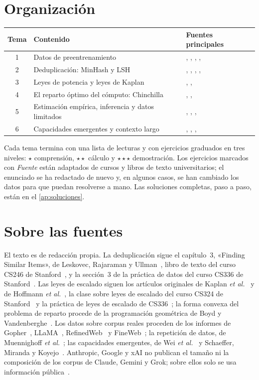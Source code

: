 \documentclass[11pt,a4paper,twoside,openany]{book}
\begin{document}
\section*{Organización}
\begin{center}
\small
\begin{tabular}{@{}cll@{}}
\toprule
Tema & Contenido & Fuentes principales \\
\midrule
1 & Datos de preentrenamiento & \cite{rae}, \cite{wenzek}, \cite{fineweb}, \cite{llama}, \cite{cs336a4} \\
2 & Deduplicación: MinHash y LSH & \cite{mmds}, \cite{cs246}, \cite{broder}, \cite{lee}, \cite{cs336a4} \\
3 & Leyes de potencia y leyes de Kaplan & \cite{kaplan}, \cite{cs324}, \cite{cs336a3} \\
4 & El reparto óptimo del cómputo: Chinchilla & \cite{hoffmann}, \cite{bv}, \cite{cs336a3} \\
5 & Estimación empírica, inferencia y datos limitados & \cite{hoffmann}, \cite{muennighoff}, \cite{sardana}, \cite{cs336a3} \\
6 & Capacidades emergentes y contexto largo & \cite{wei}, \cite{schaeffer}, \cite{chenpi}, \cite{llama3} \\
\bottomrule
\end{tabular}
\end{center}

Cada tema termina con una lista de lecturas y con ejercicios graduados en tres niveles: $\star$ comprensión, $\star\star$ cálculo y $\star\star\star$ demostración. Los ejercicios marcados con \emph{Fuente} están adaptados de cursos y libros de texto universitarios; el enunciado se ha redactado de nuevo y, en algunos casos, se han cambiado los datos para que puedan resolverse a mano. Las soluciones completas, paso a paso, están en el \cref{ap:soluciones}.

\section*{Sobre las fuentes}
El texto es de redacción propia. La deduplicación sigue el capítulo~3, «Finding Similar Items», de Leskovec, Rajaraman y Ullman~\cite{mmds}, libro de texto del curso CS246 de Stanford~\cite{cs246}, y la sección~3 de la práctica de datos del curso CS336 de Stanford~\cite{cs336a4}. Las leyes de escalado siguen los artículos originales de Kaplan \emph{et al.}~\cite{kaplan} y de Hoffmann \emph{et al.}~\cite{hoffmann}, la clase sobre leyes de escalado del curso CS324 de Stanford~\cite{cs324} y la práctica de leyes de escalado de CS336~\cite{cs336a3}; la forma convexa del problema de reparto procede de la programación geométrica de Boyd y Vandenberghe~\cite[§4.5]{bv}. Los datos sobre corpus reales proceden de los informes de Gopher~\cite{rae}, LLaMA~\cite{llama,llama2,llama3}, RefinedWeb~\cite{refinedweb} y FineWeb~\cite{fineweb}; la repetición de datos, de Muennighoff \emph{et al.}~\cite{muennighoff}; las capacidades emergentes, de Wei \emph{et al.}~\cite{wei} y Schaeffer, Miranda y Koyejo~\cite{schaeffer}. Anthropic, Google y xAI no publican el tamaño ni la composición de los corpus de Claude, Gemini y Grok; sobre ellos solo se usa información pública~\cite{gemini15}.
\end{document}
